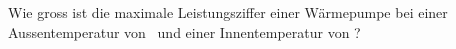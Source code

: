 Wie gross ist die maximale Leistungsziffer einer Wärmepumpe bei einer Aussentemperatur von \taO\ und einer Innentemperatur von \tiO?
